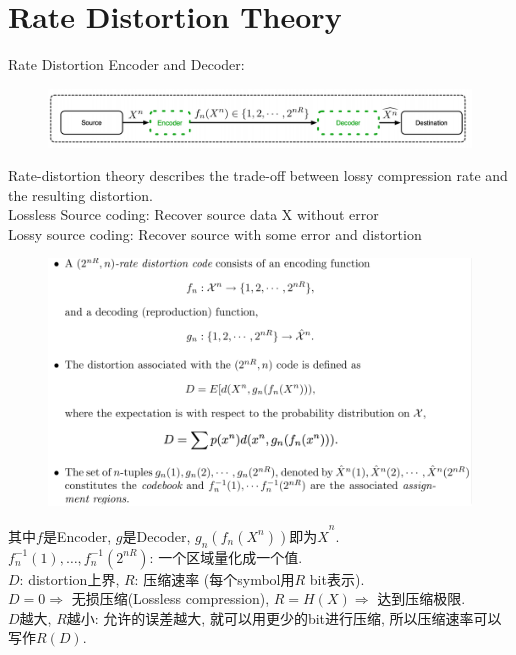 \section{Rate Distortion Theory}
Rate Distortion Encoder and Decoder:
\begin{figure}[htbp]
    \centering
    \includegraphics[width=\textwidth]{./figures/chapter8/rate_distortion.png}
\end{figure}

Rate-distortion theory describes the trade-off between lossy compression rate and the resulting distortion. \\
Lossless Source coding: Recover source data X without error \\
Lossy source coding: Recover source with some error and distortion

\begin{figure}[htbp]
    \centering
    \includegraphics[width=\textwidth]{./figures/chapter8/definition.png}
\end{figure}
其中$f$是Encoder, $g$是Decoder, $g_n\left(f_n(X^n)\right)$即为$\hat{X}^n$. \\
$f^{-1}_n(1),\ldots,f^{-1}_n(2^{nR})$: 一个区域量化成一个值. \\
$D$: distortion上界, $R$: 压缩速率 (每个symbol用$R$ bit表示). \\
$D=0\Rightarrow$ 无损压缩(Lossless compression), $R=H(X)\Rightarrow$ 达到压缩极限. \\
$D$越大, $R$越小: 允许的误差越大, 就可以用更少的bit进行压缩, 所以压缩速率可以写作$R(D)$.

